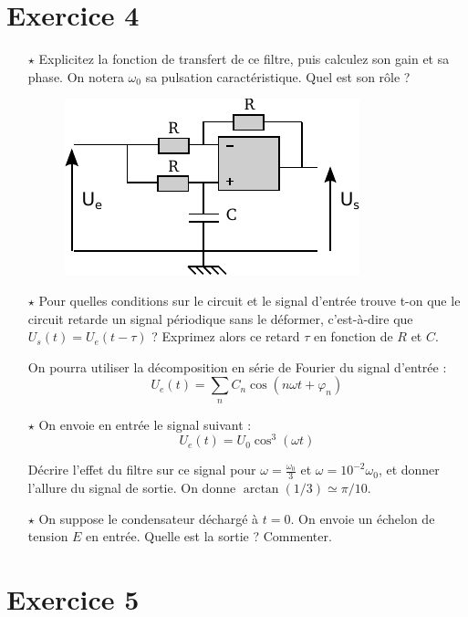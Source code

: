 \documentclass{report}
\begin{document}
\section*{Exercice 4}
\begin{itemize}
\item[$\star$] Explicitez la fonction de transfert de ce filtre, puis calculez son gain et sa phase. On notera $\omega_0$ sa pulsation caractéristique. Quel est son rôle ?
\begin{figure}[!h]
\centering
\includegraphics[width=0.5\linewidth]{circuit_.pdf}
\end{figure}

\item[$\star$]
Pour quelles conditions sur le circuit et le signal d'entrée trouve t-on que le circuit retarde un signal périodique sans le déformer, c'est-à-dire que $U_{s}(t)=U_{e}(t-\tau)$ ? Exprimez alors ce retard $\tau$ en fonction de $R$ et $C$.

On pourra utiliser la décomposition en série de Fourier du signal d'entrée :
\begin{equation}
U_e(t) = \sum_n C_n\cos(n\omega t + \varphi_n)
\end{equation}

\item[$\star$] On envoie en entrée le signal suivant :
\begin{equation}
U_{e}(t) = U_{0}\cos^{3}(\omega t)
\end{equation}

Décrire l'effet du filtre sur ce signal pour $\omega = \frac{\omega_{0}}{3}$ et $\omega=10^{-2}\omega_0$, et donner l'allure du signal de sortie. On donne $\arctan(1/3)\simeq\pi/10$.

\item[$\star$]
On suppose le condensateur déchargé à $t=0$. On envoie un échelon de tension $E$ en entrée. Quelle est la sortie ? Commenter.
\end{itemize}

\newpage

\section*{Exercice 5}
\end{document}
